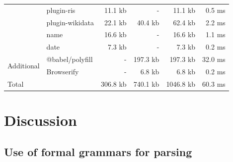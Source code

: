 \documentclass[fleqn,10pt,lineno]{wlpeerj} %
\begin{document}
\begin{table}[ht]
\begin{tabular}{|l|l|r|r|r|r|}
                                 & plugin-ris        & 11.1 kb                           & -                                          & 11.1 kb                             & 0.5 ms                                                      \\ \cline{2-6} 
                                 & plugin-wikidata   & 22.1 kb                           & 40.4 kb                                    & 62.4 kb                             & 2.2 ms                                                      \\ \cline{2-6} 
                                 & name              & 16.6 kb                           & -                                          & 16.6 kb                             & 1.1 ms                                                      \\ \cline{2-6} 
                                 & date              & 7.3 kb                            & -                                          & 7.3 kb                              & 0.2 ms                                                      \\ \hline
\multirow{2}{*}{Additional}      & @babel/polyfill   & -                                 & 197.3 kb                                   & 197.3 kb                            & 32.0 ms                                                     \\ \cline{2-6} 
                                 & Browserify        & -                                 & 6.8 kb                                     & 6.8 kb                              & 0.2 ms                                                      \\ \hline
\multicolumn{2}{|l|}{Total}                          & 306.8 kb                          & 740.1 kb                                   & 1046.8 kb                           & 60.3 ms                                                     \\ \hline
\end{tabular}
\end{table}

\section*{Discussion}

\subsection*{Use of formal grammars for parsing}
\end{document}
